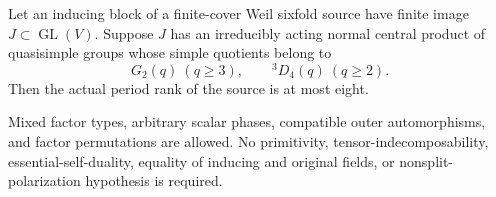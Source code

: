 \begin{theorem}
\label{D-G2T-03}
Let an inducing block of a finite-cover Weil sixfold source have
finite image $J\subset\operatorname{GL}(V)$.  Suppose $J$ has
an irreducibly acting normal central product of quasisimple
groups whose simple quotients belong to
\[
                G_2(q)\ (q\ge3),\qquad
                {}^3D_4(q)\ (q\ge2).
\]
Then the actual period rank of the source is at most eight.

Mixed factor types, arbitrary scalar phases, compatible outer
automorphisms, and factor permutations are allowed.  No
primitivity, tensor-indecomposability, essential-self-duality,
equality of inducing and original fields, or nonsplit-polarization
hypothesis is required.
\end{theorem}

